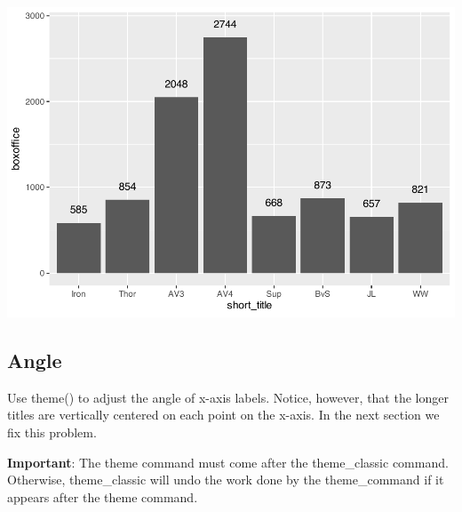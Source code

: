 \documentclass[
]{krantz}
\begin{document}
\includegraphics[width=0.65\linewidth]{bookdown_files/figure-latex/unnamed-chunk-116-1}

\hypertarget{angle}{%
\subsection{Angle}\label{angle}}

Use theme() to adjust the angle of x-axis labels. Notice, however, that the longer titles are vertically centered on each point on the x-axis. In the next section we fix this problem.

\textbf{Important}: The theme command must come after the theme\_classic command. Otherwise, theme\_classic will undo the work done by the theme\_command if it appears after the theme command.
\end{document}
